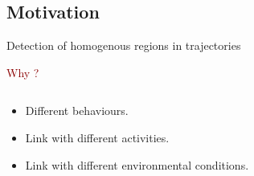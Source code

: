 \documentclass{beamer}\usepackage[]{graphicx}\usepackage[]{color}
\newcommand{\emphase}[1]{\textcolor{darkred}{#1}}
\newcommand{\paragraph}[1]{\emphase{#1}}
\begin{document}
\subsection*{Motivation}
\begin{frame}[fragile]{Detection of homogenous regions in trajectories}

  \paragraph{Why ?}
\begin{columns}
\begin{column}{0.4\textwidth}
\begin{itemize}
\item Different behaviours.
\item Link with different activities.
\item Link with different environmental conditions.
\end{itemize}

\end{column}
\begin{column}{0.6\textwidth}



  
\end{column}
\end{columns}
\end{frame}
\end{document}

